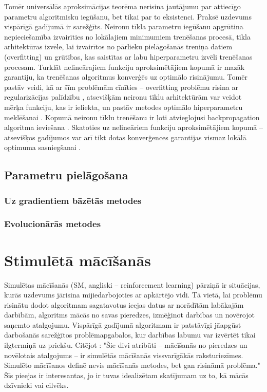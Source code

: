 \documentclass{ludis} %
\begin{document}
Tomēr universālās aproksimācijas teorēma nerisina jautājumu par attiecīgo parametru algoritmisku iegūšanu, bet tikai par to eksistenci.
Praksē uzdevums vispārīgā gadījumā ir sarežģīts.
Neironu tīkla parametru iegūšanu apgrūtina nepieciešamība izvairīties no lokālajiem minimumiem trenēšanas procesā, tīkla arhitektūras izvēle, lai izvairītos no pārlieku pielāgošanās treniņa datiem (overfitting) un grūtības, kas saistītas ar labu hiperparametru izvēli trenēšanas procesam.
Turklāt nelineārajiem funkciju aproksimētājiem kopumā ir mazāk garantiju, ka trenēšanas algoritmus konverģēs uz optimālo risinājumu.
Tomēr pastāv veidi, kā ar šīm problēmām cīnīties -- overfitting problēmu risina ar regularizācijas palīdzību \autocite{sarle1995stopped} \autocite{srivastava2014dropout}, atsevišķām neironu tīklu arhitektūrām var veidot mērķa funkciju, kas ir ieliekta, un pastāv metodes optimālo hiperparametru meklēšanai \autocite{bergstra2011algorithms}.
Kopumā neironu tīklu trenēšanu ir ļoti atvieglojusi backpropagation algoritma ieviešana \autocite{Werbos74} \autocite{Rumelhart1988}.
Skatoties uz nelineāriem funkciju aproksimētājiem kopumā -- atsevišķos gadījumos var arī tikt dotas konverģences garantijas vismaz lokālā optimuma sasniegšanai \autocite{bhatnagar2009convergent}.

\section{Parametru pielāgošana}
\subsection{Uz gradientiem bāzētās metodes}
\subsection{Evolucionārās metodes}

\chapter{Stimulētā mācīšanās} \label{chap:stim}
Simulētas mācīšanās (SM, angliski -- reinforcement learning) pārziņā ir situācijas, kurās uzdevums jārisina mijiedarbojoties ar apkārtējo vidi. 
Tā vietā, lai problēmu risinātu dodot algoritmam sagatavotus ieejas datus ar norādītām labākajām darbībām, algoritms mācās no savas pieredzes, izmēģinot darbības un novērojot saņemto atalgojumu.
Vispārīgā gadījumā algoritmam ir patstāvīgi jāapgūst darbošanās sarežģītos problēmapgabalos, kur darbības labumu var izvērtēt tikai ilgtermiņā uz priekšu.
Citējot \citet{Barto}: "Šie divi atribūti -- mācīšanās no pieredzes un novēlotais atalgojums -- ir simulētās mācīšanās vissvarīgākās raksturiezīmes.
Simulēto mācīšanos definē nevis mācīšanās metodes, bet gan risināmā problēma."
Šīs pieejas ir interesantas, jo ir tuvas idealizētam skatījumam uz to, kā mācās dzīvnieki vai cilvēks.
\end{document}
